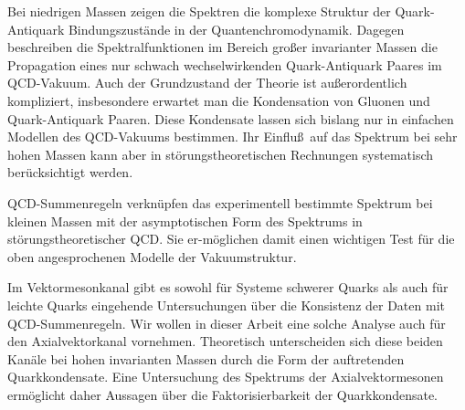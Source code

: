 Bei niedrigen Massen zeigen die Spektren die komplexe Struktur der 
Quark-Antiquark Bindungszust\"ande in der Quantenchromodynamik.
Dagegen beschreiben die Spektralfunktionen im Bereich gro\ss er invarianter
Massen die Propagation eines nur schwach wechselwirkenden 
Quark-Antiquark Paares im QCD-Vakuum. Auch der Grundzustand der Theorie
ist au\ss erordentlich kompliziert, insbesondere erwartet man die
Kondensation von Gluonen und Quark-Antiquark Paaren. Diese Kondensate 
lassen sich bislang nur in einfachen Modellen des QCD-Vakuums 
bestimmen. Ihr Einflu\ss\ auf das Spektrum bei sehr hohen Massen 
kann aber in st\"orungstheoretischen Rechnungen systematisch 
ber\"ucksichtigt werden.

QCD-Summenregeln verkn\"upfen das experimentell bestimmte Spektrum bei
kleinen Massen mit der asymptotischen Form des Spektrums in 
st\"orungstheoretischer QCD. Sie er-m\"og\-li\-chen damit einen wichtigen
Test f\"ur die oben angesprochenen Modelle der Vakuumstruktur.

Im Vektormesonkanal gibt es sowohl f\"ur Systeme schwerer Quarks als
auch f\"ur leichte Quarks eingehende Untersuchungen \"uber die 
Konsistenz der Daten mit QCD-Sum\-men\-re\-geln. Wir wollen in dieser 
Arbeit eine solche Analyse auch f\"ur den Axialvektorkanal vornehmen.
Theoretisch unterscheiden sich diese beiden Kan\"ale bei hohen 
invarianten Massen durch die Form der auftretenden Quarkkondensate.  
Eine Untersuchung des Spektrums der Axialvektormesonen erm\"oglicht daher
Aussagen \"uber die Faktorisierbarkeit der Quarkkondensate.
